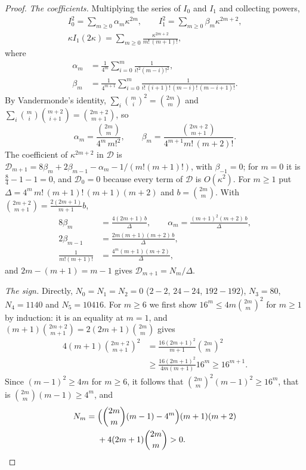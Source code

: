 \begin{proof}
\emph{The coefficients.} Multiplying the series of $I_0$ and $I_1$ and
collecting powers,
\[
\begin{gathered}
I_0^2=\sum_{m\ge0}\alpha_m\kappa^{2m},\qquad I_1^2=\sum_{m\ge0}\beta_m
\kappa^{2m+2},\\
\kappa I_1(2\kappa)=\sum_{m\ge0}\frac{\kappa^{2m+2}}{m!\,(m+1)!},
\end{gathered}
\]
where
\[
\begin{aligned}
\alpha_m&=\frac1{4^m}\sum_{i=0}^m\frac1{i!^2(m-i)!^2},\\
\beta_m&=\frac1{4^{m+1}}\sum_{i=0}^m\frac1{i!\,(i+1)!\,(m-i)!\,(m-i+1)!}.
\end{aligned}
\]
By Vandermonde's identity, $\sum_i\binom mi^2=\binom{2m}m$ and
$\sum_i\binom mi\binom{m+2}{i+1}=\binom{2m+2}{m+1}$, so
\[
\alpha_m=\frac{\binom{2m}m}{4^m\,m!^2},\qquad\beta_m=\frac{\binom{2m+2}{m+1}}
{4^{m+1}m!\,(m+2)!}.
\]
The coefficient of $\kappa^{2m+2}$ in $\mathcal D$ is $\mathcal D_{m+1}=8\beta_m
+2\beta_{m-1}-\alpha_m-1/(m!(m+1)!)$, with $\beta_{-1}=0$; for $m=0$ it is
$\frac84-1-1=0$, and $\mathcal D_0=0$ because every term of $\mathcal D$ is
$O(\kappa^2)$. For $m\ge1$ put $\Delta=4^m\,m!\,(m+1)!\,(m+1)(m+2)$ and
$b=\binom{2m}m$. With $\binom{2m+2}{m+1}=\frac{2(2m+1)}{m+1}b$,
\[
\begin{aligned}
8\beta_m&=\frac{4(2m+1)\,b}\Delta,\qquad\alpha_m=\frac{(m+1)^2(m+2)\,b}\Delta,\\
2\beta_{m-1}&=\frac{2m(m+1)(m+2)\,b}\Delta,\\
\frac1{m!(m+1)!}&=\frac{4^m(m+1)(m+2)}\Delta,
\end{aligned}
\]
and $2m-(m+1)=m-1$ gives $\mathcal D_{m+1}=N_m/\Delta$.

\emph{The sign.} Directly, $N_0=N_1=N_2=0$ ($2-2$, $24-24$, $192-192$),
$N_3=80$, $N_4=1140$ and $N_5=10416$. For $m\ge6$ we first show
$16^m\le4m\binom{2m}m^2$ for $m\ge1$ by induction: it is an equality at
$m=1$, and $(m+1)\binom{2m+2}{m+1}=2(2m+1)\binom{2m}m$ gives
\[
\begin{aligned}
4(m+1)\binom{2m+2}{m+1}^2&=\frac{16(2m+1)^2}{m+1}\binom{2m}m^2\\
&\ge\frac{16(2m+1)^2}{4m(m+1)}16^m\ge16^{m+1}.
\end{aligned}
\]
Since $(m-1)^2\ge4m$ for $m\ge6$, it follows that $\binom{2m}m^2(m-1)^2\ge
16^m$, that is $\binom{2m}m(m-1)\ge4^m$, and
\[
\begin{aligned}
N_m={}&\Bigl(\binom{2m}m(m-1)-4^m\Bigr)(m+1)(m+2)\\
&+4(2m+1)\binom{2m}m>0 .
\end{aligned}
\]
\end{proof}

